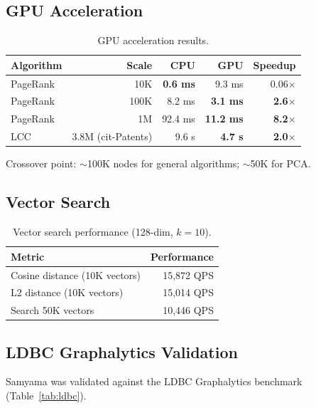 \documentclass[11pt]{article}
\begin{document}
\subsection{GPU Acceleration}

\begin{table}[H]
  \centering
  \caption{GPU acceleration results.}
  \label{tab:gpu}
  \begin{tabular}{@{}lrrrr@{}}
    \toprule
    \textbf{Algorithm} & \textbf{Scale} & \textbf{CPU} & \textbf{GPU} & \textbf{Speedup} \\
    \midrule
    PageRank & 10K  & \textbf{0.6 ms} & 9.3 ms          & 0.06$\times$ \\
    PageRank & 100K & 8.2 ms          & \textbf{3.1 ms}  & \textbf{2.6$\times$} \\
    PageRank & 1M   & 92.4 ms         & \textbf{11.2 ms} & \textbf{8.2$\times$} \\
    LCC      & 3.8M (cit-Patents) & 9.6 s & \textbf{4.7 s} & \textbf{2.0$\times$} \\
    \bottomrule
  \end{tabular}
\end{table}

Crossover point: ${\sim}$100K nodes for general algorithms; ${\sim}$50K for PCA.

\subsection{Vector Search}

\begin{table}[H]
  \centering
  \caption{Vector search performance (128-dim, $k{=}10$).}
  \label{tab:vector}
  \begin{tabular}{@{}lr@{}}
    \toprule
    \textbf{Metric} & \textbf{Performance} \\
    \midrule
    Cosine distance (10K vectors)  & 15,872 QPS \\
    L2 distance (10K vectors)      & 15,014 QPS \\
    Search 50K vectors             & 10,446 QPS \\
    \bottomrule
  \end{tabular}
\end{table}

\subsection{LDBC Graphalytics Validation}

Samyama was validated against the LDBC Graphalytics benchmark~\citep{iosup2016ldbc} (Table~\ref{tab:ldbc}).
\end{document}
